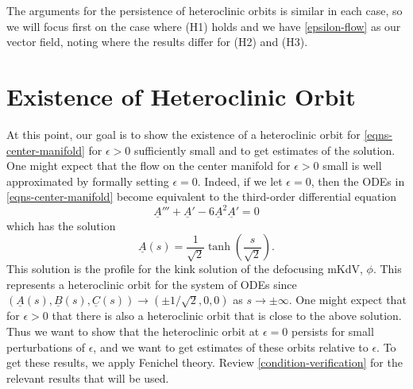 The arguments for the persistence of heteroclinic orbits is similar in each case, so we will focus first on the case where (H1) holds and we have \cref{epsilon-flow} as our vector field, noting where the results differ for (H2) and (H3).
\section{Existence of Heteroclinic Orbit}



At this point, our goal is to show the existence of a heteroclinic orbit for \cref{eqns-center-manifold} for \(\epsilon>0\) sufficiently small and to get estimates of the solution. One might expect that the flow on the center manifold for \(\epsilon>0\) small is well approximated by formally setting \(\epsilon = 0\). Indeed, if we let \(\epsilon = 0\), then the ODEs in \cref{eqns-center-manifold} become equivalent to the third-order differential equation
\begin{equation}
	\underline A ''' + \underline A'  - 6 \underline A^2 \underline A' = 0 
\end{equation}
which has the solution 
\begin{equation}
	\underline A(s) = \frac 1 {\sqrt 2} \tanh\left(\frac s {\sqrt 2}\right).
\end{equation}
This solution is the profile for the kink solution of the defocusing mKdV, \(\phi\). This represents a heteroclinic orbit for the system of ODEs since \((\underline A(s), \underline B(s), \underline C(s)) \to (\pm1/\sqrt 2, 0, 0)\) as \(s\to\pm \infty.\) One might expect that for \(\epsilon > 0\) that there is also a heteroclinic orbit that is close to the above solution. Thus we want to show that the heteroclinic orbit at \(\epsilon = 0\) persists for small perturbations of \(\epsilon\), and we want to get estimates of these orbits relative to \(\epsilon\). To get these results, we apply Fenichel theory. Review \cref{condition-verification} for the relevant results that will be used.


